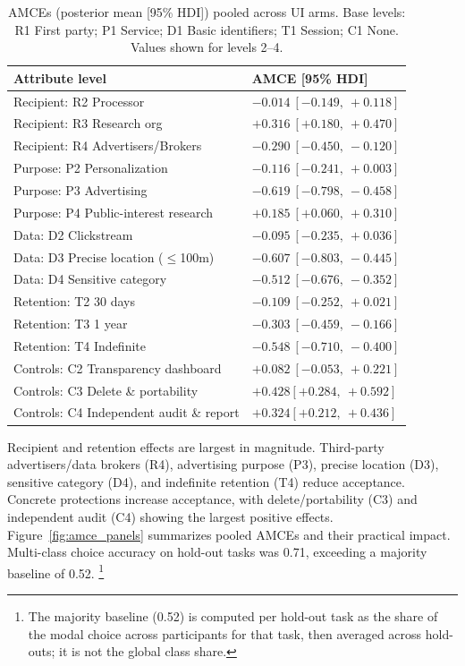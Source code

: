 \documentclass{eusset}
\begin{document}
\begin{table}[ht]
  \centering
  \begin{tabular}{l l}
    \textbf{Attribute level} & \textbf{AMCE [95\% HDI]} \\
    \hline
    Recipient: R2 Processor                & $-0.014\ [-0.149,\ +0.118]$ \\
    Recipient: R3 Research org             & $+0.316\ [+0.180,\ +0.470]$ \\
    Recipient: R4 Advertisers/Brokers      & $\mathbf{-0.290}\ \mathbf{[-0.450,\ -0.120]}$ \\
    \addlinespace
    Purpose: P2 Personalization            & $-0.116\ [-0.241,\ +0.003]$ \\
    Purpose: P3 Advertising                & $\mathbf{-0.619}\ \mathbf{[-0.798,\ -0.458]}$ \\
    Purpose: P4 Public-interest research   & $\mathbf{+0.185}\ \mathbf{[+0.060,\ +0.310]}$ \\
    \addlinespace
    Data: D2 Clickstream                   & $-0.095\ [-0.235,\ +0.036]$ \\
    Data: D3 Precise location ($\le$100m)  & $\mathbf{-0.607}\ \mathbf{[-0.803,\ -0.445]}$ \\
    Data: D4 Sensitive category            & $\mathbf{-0.512}\ \mathbf{[-0.676,\ -0.352]}$ \\
    \addlinespace
    Retention: T2 30 days                  & $-0.109\ [-0.252,\ +0.021]$ \\
    Retention: T3 1 year                   & $\mathbf{-0.303}\ \mathbf{[-0.459,\ -0.166]}$ \\
    Retention: T4 Indefinite               & $\mathbf{-0.548}\ \mathbf{[-0.710,\ -0.400]}$ \\
    \addlinespace
    Controls: C2 Transparency dashboard    & $+0.082\ [-0.053,\ +0.221]$ \\
    Controls: C3 Delete \& portability     & $\mathbf{+0.428} \mathbf{[+0.284,\ +0.592]}$ \\
    Controls: C4 Independent audit \& report & $\mathbf{+0.324} \mathbf{[+0.212,\ +0.436]}$ \\
  \end{tabular}
  \caption{AMCEs (posterior mean [95\% HDI]) pooled across UI arms. Base levels: R1 First party; P1 Service; D1 Basic identifiers; T1 Session; C1 None. Values shown for levels 2--4.}
  \label{tab:amce}
\end{table}

\noindent Recipient and retention effects are largest in magnitude. Third-party advertisers/data brokers (R4), advertising purpose (P3), precise location (D3), sensitive category (D4), and indefinite retention (T4) reduce acceptance. Concrete protections increase acceptance, with delete/portability (C3) and independent audit (C4) showing the largest positive effects. Figure~\ref{fig:amce_panels} summarizes pooled AMCEs and their practical impact. Multi-class choice accuracy on hold-out tasks was 0.71, exceeding a majority baseline of 0.52. \footnote{The majority baseline (0.52) is computed per hold-out task as the share of the modal choice across participants for that task, then averaged across hold-outs; it is not the global class share.}
\end{document}
